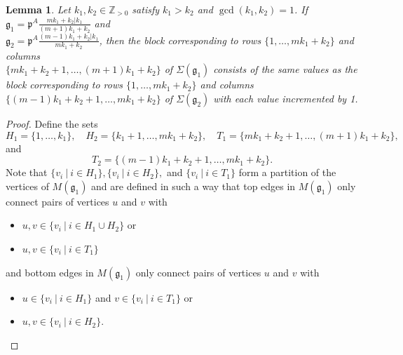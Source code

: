 \documentclass[letterpaper,10pt]{article}
\newtheorem{lemma}[theorem]{Lemma}
\begin{document}
\begin{lemma}\label{lem:trbgen}
Let $k_1,k_2\in\mathbb{Z}_{>0}$ satisfy $k_1>k_2$ and $\gcd(k_1,k_2)=1$. If $\mathfrak{g}_1=\mathfrak{p}^A\frac{mk_1+k_2|k_1}{(m+1)k_1+k_2}$ and \\ $\mathfrak{g}_2=\mathfrak{p}^A\frac{(m-1)k_1+k_2|k_1}{mk_1+k_2}$, then the block corresponding to rows $\{1,\hdots,mk_1+k_2\}$ and columns \\ $\{mk_1+k_2+1,\hdots,(m+1)k_1+k_2\}$ of $\Sigma(\mathfrak{g}_1)$ consists of the same values as the block corresponding to rows $\{1,\hdots,mk_1+k_2\}$ and columns $\{(m-1)k_1+k_2+1,\hdots,mk_1+k_2\}$ of $\Sigma(\mathfrak{g}_2)$ with each value incremented by 1.
\end{lemma}
\begin{proof}
Define the sets $$H_1=\{1,\hdots,k_1\},\quad H_2=\{k_1+1,\hdots,mk_1+k_2\},\quad T_1=\{mk_1+k_2+1,\hdots,(m+1)k_1+k_2\},$$ and $$T_2=\{(m-1)k_1+k_2+1,\hdots,mk_1+k_2\}.$$ Note that $\{v_i~|~i\in H_1\},\{v_i~|~i\in H_2\},$ and $\{v_i~|~i\in T_1\}$ form a partition of the vertices of $M(\mathfrak{g}_1)$ and are defined in such a way that top edges in $M(\mathfrak{g}_1)$ only connect pairs of vertices $u$ and $v$ with
\begin{itemize}
    \item $u,v\in \{v_i~|~i\in H_1\cup H_2\}$ or
    \item $u,v\in \{v_i~|~i\in T_1\}$
\end{itemize}
and bottom edges in $M(\mathfrak{g}_1)$ only connect pairs of vertices $u$ and $v$ with
\begin{itemize}
    \item $u\in\{v_i~|~i\in H_1\}$ and $v\in\{v_i~|~i\in T_1\}$ or
    \item $u,v\in \{v_i~|~i\in H_2\}$.
\end{itemize}

\end{proof}
\end{document}
